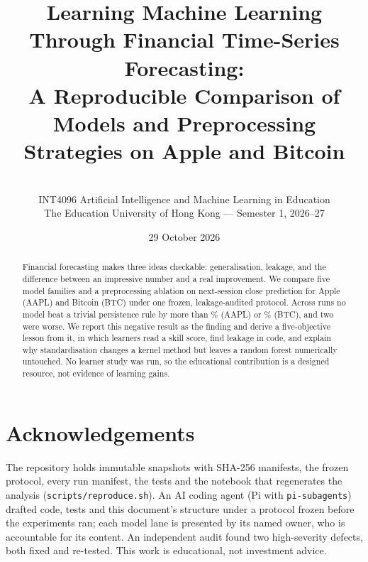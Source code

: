 \documentclass[11pt,a4paper]{article}
\title{\vspace{-1.2cm}\bfseries Learning Machine Learning Through Financial
Time-Series Forecasting:\\[2pt]
\large A Reproducible Comparison of Models and Preprocessing Strategies on
Apple and Bitcoin}
\author{\GroupAuthors\\[2pt]
\small INT4096 Artificial Intelligence and Machine Learning in Education\\
\small The Education University of Hong Kong --- Semester 1, 2026--27}
\date{29 October 2026}
\begin{document}
\maketitle
\vspace{-0.6cm}

\begin{abstract}
\noindent
Financial forecasting makes three ideas checkable: generalisation, leakage, and the
difference between an impressive number and a real improvement. We compare five
model families and a preprocessing ablation on next-session close prediction for
Apple (AAPL) and Bitcoin (BTC) under one frozen, leakage-audited protocol. Across
\NRunTotal{} runs no model beat a trivial persistence rule by more than
\BestAAPLSkill\% (AAPL) or \BestBTCSkill\% (BTC), and two were worse. We report
this negative result as the finding and derive a five-objective lesson from it, in
which learners read a skill score, find leakage in code, and explain why
standardisation changes a kernel method but leaves a random forest numerically
untouched. No learner study was run, so the educational contribution is a designed
resource, not evidence of learning gains.
\end{abstract}

\vspace{0.2cm}
















\section*{Acknowledgements}
\noindent
\noindent The repository holds immutable snapshots with SHA-256 manifests, the frozen
protocol, every run manifest, the tests and the notebook that regenerates the
analysis (\texttt{scripts/reproduce.sh}). An AI coding agent (Pi with
\texttt{pi-subagents}) drafted code, tests and this document's structure under a
protocol frozen before the experiments ran; each model lane is presented by its
named owner, who is accountable for its content. An independent audit found two
high-severity defects, both fixed and re-tested. This work is educational, not
investment advice.



\end{document}
